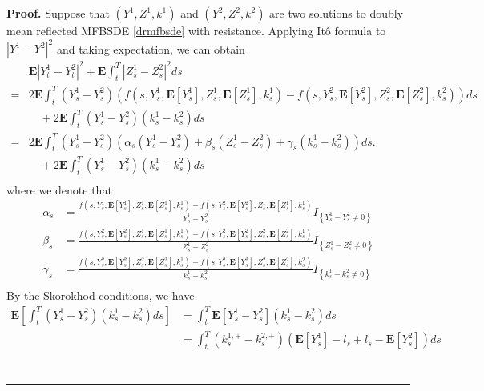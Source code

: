 \documentclass[10pt]{article}%
\numberwithin{equation}{section}
\newenvironment{proof}[1][Proof]{\noindent \textbf{#1.} }{\  \rule{0.5em}{0.5em}}
\def \E{\mathbf{E}}
\begin{document}
\iffalse
\begin{proof}
    Suppose that $(Y^1,Z^1,k^1)$ and $(Y^2,Z^2,k^2)$ are two solutions to doubly mean reflected MFBSDE  \eqref{drmfbsde} {\color{red}with resistance}.
    Applying It\^o formula to $\left|Y^1-Y^2\right|^2$ and taking expectation, we can obtain 
    \begin{equation}
    \begin{split}
      & \mathbf{E}\left|Y_t^1-Y_t^2\right|^2+\mathbf{E}\int_{t}^{T}\left|Z_s^1-Z_s^2\right|^2ds\\
      =&2\mathbf{E}\int_{t}^{T}(Y^1_s-Y^2_s)(f(s,Y_s^1,\mathbf{E}[Y_s^1],Z_s^1,\mathbf{E}[Z_s^1],k_s^1)-f(s,Y_s^2,\mathbf{E}[Y_s^2],Z_s^2,\mathbf{E}[Z_s^2],k_s^2))ds\\
      &\quad+2\mathbf{E}\int_{t}^{T}(Y^1_s-Y^2_s)(k_s^1-k_s^2)ds\\
      =&2\mathbf{E}\int_{t}^{T}(Y^1_s-Y^2_s)(\alpha_s(Y_s^1-Y_s^2)+\beta_s(Z_s^1-Z_s^2)+\gamma_s(k_s^1-k_s^2))ds.\\
      &\quad+2\mathbf{E}\int_{t}^{T}(Y^1_s-Y^2_s)(k_s^1-k_s^2)ds\\
    \end{split}
    \end{equation}
    where we denote that 
    \begin{equation*}
     \begin{split}
         \alpha_s&=\frac{f(s,Y_s^1,\mathbf{E}[Y_s^1],Z_s^1,\mathbf{E}[Z_s^1],k_s^1)-f(s,Y_s^2,\mathbf{E}[Y_s^2],Z_s^1,\mathbf{E}[Z_s^1],k_s^1)}{Y_s^1-Y_s^2}I_{\left\{Y_s^1-Y_s^2\ne 0\right\}} \\
         \beta_s&=\frac{f(s,Y_s^2,\mathbf{E}[Y_s^2],Z_s^1,\mathbf{E}[Z_s^1],k_s^1)-f(s,Y_s^2,\mathbf{E}[Y_s^2],Z_s^2,\mathbf{E}[Z_s^2],k_s^1)}{Z_s^1-Z_s^2}I_{\left\{Z_s^1-Z_s^2\ne 0\right\}} \\
         \gamma_s&=\frac{f(s,Y_s^2,\mathbf{E}[Y_s^2],Z_s^2,\mathbf{E}[Z_s^2],k_s^1)-f(s,Y_s^2,\mathbf{E}[Y_s^2],Z_s^2,\mathbf{E}[Z_s^2],k_s^2)}{k_s^1-k_s^2}I_{\left\{k_s^1-k_s^2\ne 0\right\}} \\
         \end{split}   
    \end{equation*}
    By the Skorokhod conditions, we have
  \begin{equation*}
      \begin{split}
          \E\left[\int_t^T(Y^1_s-Y^2_s)(k^1_s-k^2_s) ds\right]
          &=\int_t^T\E\left[Y^1_s-Y^2_s\right](k^1_s-k^2_s)ds\\
          &=\int_{t}^{T}(k_s^{1,+}-k_s^{2,+})(\mathbf{E}[Y^1_s]-l_s+l_s-\mathbf{E}[Y^2_s])ds \\

\end{split}
\end{equation*}
\end{proof}
\end{document}
